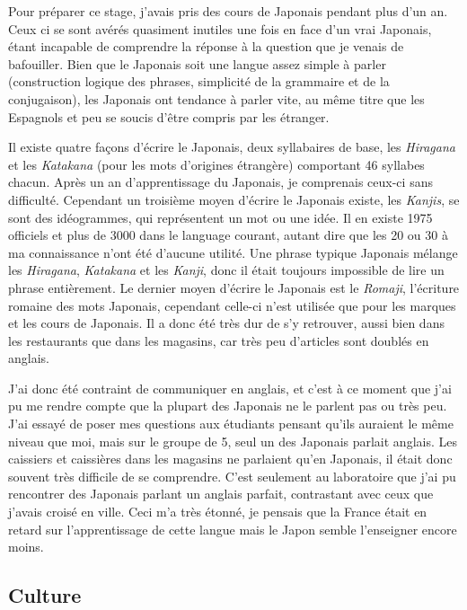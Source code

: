 \documentclass[journal]{RapportFR}
\begin{document}
\begin{CJK*}{UTF8}{min}
Pour pr\'eparer ce stage, j'avais pris des cours de Japonais pendant plus d'un an. Ceux ci se sont av\'er\'es quasiment inutiles une fois en face d'un vrai Japonais, étant incapable de comprendre la r\'eponse \`a la question que je venais de bafouiller. Bien que le Japonais soit une langue assez simple \`a parler (construction logique des phrases, simplicit\'e de la grammaire et de la conjugaison), les Japonais ont tendance \`a parler vite, au m\^eme titre que les Espagnols et peu se soucis d'\^etre compris par les \'etranger.

Il existe quatre fa\c cons d'\'ecrire le Japonais, deux syllabaires de base, les \textit{Hiragana} et les \textit{Katakana} (pour les mots d'origines \'etrang\`ere) comportant 46 syllabes chacun. Apr\`es un an d'apprentissage du Japonais, je comprenais ceux-ci sans difficult\'e. Cependant un troisi\`eme moyen d'écrire le Japonais existe, les \textit{Kanjis}, se sont des id\'eogrammes, qui repr\'esentent un mot ou une id\'ee. Il en existe 1975 officiels et plus de 3000 dans le language courant, autant dire que les 20 ou 30 \`a ma connaissance n'ont \'et\'e d'aucune utilit\'e. Une phrase typique Japonais m\'elange les \textit{Hiragana}, \textit{Katakana} et les \textit{Kanji}, donc il \'etait toujours impossible de lire un phrase enti\`erement. Le dernier moyen d'\'ecrire le Japonais est le \textit{Romaji}, l'\'ecriture romaine des mots Japonais, cependant celle-ci n'est utilis\'ee que pour les marques et les cours de Japonais.
Il a donc \'et\'e tr\`es dur de s'y retrouver, aussi bien dans les restaurants que dans les magasins, car tr\`es peu d'articles sont doubl\'es en anglais.

J'ai donc \'et\'e contraint de communiquer en anglais, et c'est \`a ce moment que j'ai pu me rendre compte que la plupart des Japonais ne le parlent pas ou tr\`es peu. J'ai essay\'e de poser mes questions aux \'etudiants pensant qu'ils auraient le m\^eme niveau que moi, mais sur le groupe de 5, seul un des Japonais parlait anglais. Les caissiers et caissi\`eres dans les magasins ne parlaient qu'en Japonais, il \'etait donc souvent tr\`es difficile de se comprendre.
C'est seulement au laboratoire que j'ai pu rencontrer des Japonais parlant un anglais parfait, contrastant avec ceux que j'avais crois\'e en ville.
Ceci m'a tr\`es \'etonn\'e, je pensais que la France \'etait en retard sur l'apprentissage de cette langue mais le Japon semble l'enseigner encore moins.

\subsection{Culture}



\end{CJK*}
\end{document}
